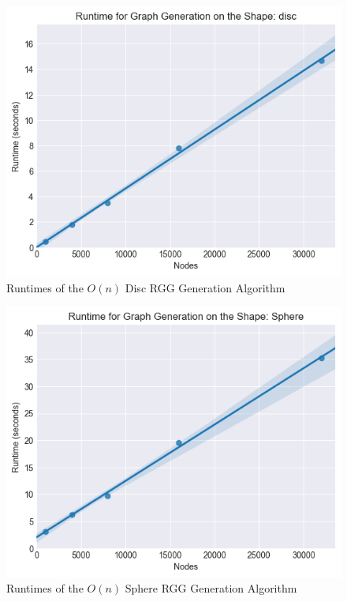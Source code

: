 \documentclass{article}
\begin{document}
  \begin{figure}[H]
    \centering
    \includegraphics[width=1 \textwidth]{disc/runtime/runtime_chart}
    \caption{Runtimes of the $O(n)$ Disc RGG Generation Algorithm}
  \end{figure}

  \begin{figure}[H]
    \centering
    \includegraphics[width=1 \textwidth]{sphere/runtime/runtime_chart}
    \caption{Runtimes of the $O(n)$ Sphere RGG Generation Algorithm}
  \end{figure}
\end{document}
